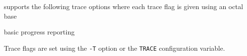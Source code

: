 
 supports the following trace options where each
trace flag is given using an octal base
\begin{optlist}
  basic progress reporting
\end{optlist}
Trace flags are set using the \texttt{-T} option or the  \texttt{TRACE} 
configuration variable.







